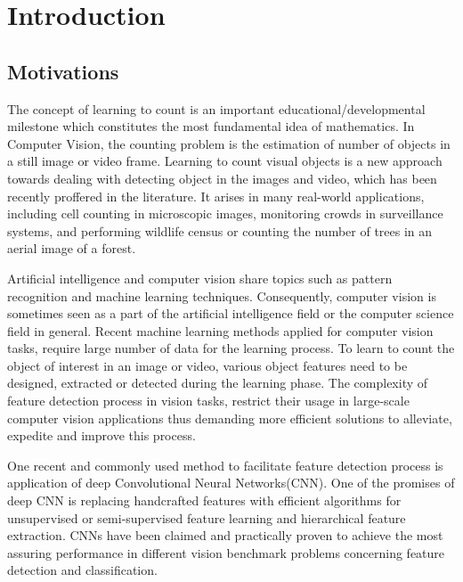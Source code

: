 \chapter{Introduction}
\label{sec:introduction}
\section{Motivations}
The concept of learning to count is an important educational/developmental milestone  which constitutes the most fundamental idea of mathematics. In Computer Vision\cite{umbaugh1997computer}, the counting problem is the estimation of number of objects in a still image or video frame. Learning to count visual objects is a new approach towards dealing with detecting object in the images and video, which has been recently proffered in the literature\cite{viola2005detecting, rabaud2006counting, kong2005counting, chan2008privacy, segui2015learning}. It arises in many real-world applications, including cell counting in microscopic images\cite{flaccavento2011learning}, monitoring crowds in surveillance systems\cite{rahmalan2006crowd, valera2005intelligent}, and performing wildlife census or counting the number of trees in an aerial image of a forest\cite{brandtberg1998automated, pollock1996automatic,NIPS2010_4043}. 

Artificial intelligence and computer vision share topics such as pattern recognition and machine learning\cite{michalski2013machine, mitchell1997machine} techniques. Consequently, computer vision is sometimes seen as a part of the artificial intelligence field or the computer science field in general. Recent machine learning methods applied for computer vision tasks, require large number of data for the learning process. To learn to count the object of interest in an image or video, various object features need to be designed, extracted or detected during the learning phase. The complexity of feature detection process in vision tasks, restrict their usage in large-scale computer vision applications thus demanding more efficient solutions to alleviate, expedite and improve this process. 

\indent One recent and commonly used method to facilitate feature detection process is application of deep Convolutional Neural Networks(CNN)\cite{szegedy2015going, krizhevsky2012imagenet, lecun1995convolutional, sermanet2013overfeat, ji20133d, taylor2010convolutional}. One of the promises of deep CNN is replacing handcrafted features with efficient algorithms for unsupervised or semi-supervised feature learning and hierarchical feature extraction\cite{song2013hierarchical}. CNNs have been claimed and practically proven to achieve the most assuring performance in different vision benchmark problems concerning feature detection and classification\cite{ciresan2011flexible, szegedy2015going, ciresan2012multi}. 

